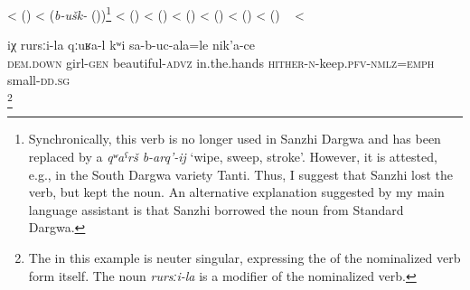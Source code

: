\begin{exe}
	\ex	\label{irʁ-ala understanding}
	\begin{xlist}
		\TabPositions{12em,14em}
		\ex	{} 		\tab	<	\tab	{}  ()
		\ex	{} 		\tab	<	\tab  (\textit{b-ušk-}	 ())\footnote{Synchronically, this verb is no longer used in Sanzhi Dargwa and has been replaced by a  \textit{qʷaˁrš b-arq'-ij} `wipe, sweep, stroke'. However, it is attested, e.g., in the South Dargwa variety Tanti. Thus, I suggest that Sanzhi lost the verb, but kept the noun. An alternative explanation suggested by my main language assistant is that Sanzhi borrowed the noun from Standard Dargwa.}
		\ex	{} 		\tab	<	\tab	{}  ()
		\ex	{} 		\tab	<	\tab	{}  ()
		\ex	{} 		\tab	<	\tab	{}  ()
		\ex	{} 		\tab	<	\tab	{}  ()
		\ex	{} 	\tab	<	\tab	{}  ()
		\ex	{} 		\tab	<	\tab	{}  ()
		\ex	{}  \label{irʁ-ala understandingA}
		\sn	~\hspace*{1em}				\tab	<	\tab	{} 
	\end{xlist}
\end{exe}

\begin{exe}
	\ex	\label{(Look at) the way of the girl's holding the child in her hands}
	\gll	iχ	rursːi-la	qːuʁa-l	kʷi	sa-b-uc-ala=le	nik'a-ce\\
		\textsc{dem.down}	girl-\textsc{gen}	beautiful-\textsc{advz}	in.the.hands	\textsc{hither-n}-keep.\textsc{pfv}-\textsc{nmlz}=\textsc{emph}	small-\textsc{dd}.\textsc{sg}\\
	\glt	{}\footnote{The  in this example is neuter singular, expressing the  of the nominalized verb form itself. The noun \textit{rursːi-la} is a  modifier of the nominalized verb.}
\end{exe}



